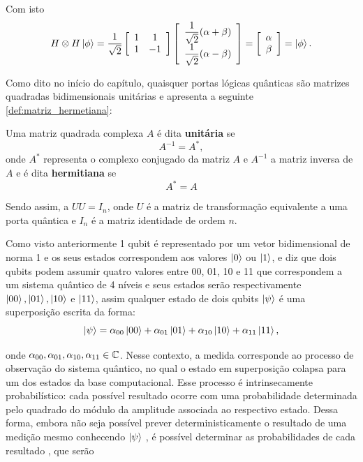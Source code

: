     Com isto
    $$
        H\otimes H\ket{\phi}= \dfrac{1}{\sqrt{2}}\left[\begin{array}{cc}
             1 & 1 \\
             1 & -1 
        \end{array}\right]\left[\begin{array}{c}
             \dfrac{1}{\sqrt{2}}(\alpha+\beta) \\
             \dfrac{1}{\sqrt{2}}(\alpha - \beta)
        \end{array}\right] = \left[\begin{array}{c}
             \alpha \\
             \beta 
        \end{array}\right]=\ket{\phi}.
    $$
    
    
Como dito no início do capítulo, quaisquer portas lógicas quânticas são matrizes quadradas bidimensionais unitárias e \textcite[pag. 425]{Anton2012} apresenta a seguinte \autoref{def:matriz_hermetiana}:

    \begin{defi}
        \label{def:matriz_hermetiana}
        Uma matriz quadrada complexa $A$ é dita \textbf{unitária} se $$A^{-1}=A^*,$$ onde $A^*$ representa o complexo conjugado da matriz $A$ e $A^{-1}$ a matriz inversa de $A$ e é dita \textbf{hermitiana} se $$A^*=A$$
    \end{defi}
    
Sendo assim, a $UU=I_n$, onde $U$ é a matriz de transformação equivalente a uma porta quântica e $I_n$ é a matriz identidade de ordem $n$.

Como visto anteriormente 1 qubit é representado por um vetor bidimensional de norma 1 e os seus estados correspondem aos valores $\ket{0}$ ou $\ket{1}$, e \textcite{Amaral2011MecanicaFormacao} diz que dois qubits podem assumir quatro valores entre 00, 01, 10 e 11 que correspondem a um sistema quântico de 4 níveis e seus estados serão respectivamente $\ket{00}, \ket{01}, \ket{10}$ e $\ket{11}$, assim qualquer {\red estado de dois qubits} $\ket{\psi}$ é uma superposição escrita da forma:
    $$
        \ket{\psi}=\alpha_{00}\ket{00}+\alpha_{01}\ket{01}+\alpha_{10}\ket{10}+\alpha_{11}\ket{11},
    $$

\noindent onde $\alpha_{00}, \alpha_{01}, \alpha_{10}, \alpha_{11}\in\operatorname{\mathbb{C}}$. {\red Nesse contexto, a medida corresponde ao processo de observação do sistema quântico, no qual o estado em superposição colapsa para um dos estados da base computacional. Esse processo é intrinsecamente probabilístico: cada possível resultado ocorre com uma probabilidade determinada pelo quadrado do módulo da amplitude associada ao respectivo estado. Dessa forma, embora não seja possível prever deterministicamente o resultado de uma medição mesmo conhecendo $\ket{\psi}$ }, é possível determinar as probabilidades de cada resultado \cite{griffiths2018introduction, Marquezino2019}, que serão

